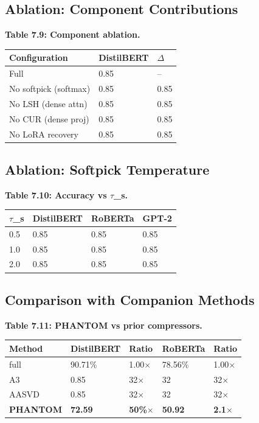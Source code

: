 \subsection{Ablation: Component Contributions}

\textbf{Table 7.9: Component ablation.}

\begin{table}[H]
\centering
\small
\begin{tabular}{lll}
\toprule
\textbf{Configuration} & \textbf{DistilBERT} & \textbf{$\Delta$} \\
\midrule
Full & 0.85 & -- \\
No softpick (softmax) & 0.85 & 0.85 \\
No LSH (dense attn) & 0.85 & 0.85 \\
No CUR (dense proj) & 0.85 & 0.85 \\
No LoRA recovery & 0.85 & 0.85 \\
\bottomrule
\end{tabular}
\end{table}

\subsection{Ablation: Softpick Temperature}

\textbf{Table 7.10: Accuracy vs $\tau$\_s.}

\begin{table}[H]
\centering
\small
\begin{tabular}{llll}
\toprule
\textbf{$\tau$\_s} & \textbf{DistilBERT} & \textbf{RoBERTa} & \textbf{GPT-2} \\
\midrule
0.5 & 0.85 & 0.85 & 0.85 \\
1.0 & 0.85 & 0.85 & 0.85 \\
2.0 & 0.85 & 0.85 & 0.85 \\
\bottomrule
\end{tabular}
\end{table}

\subsection{Comparison with Companion Methods}

\textbf{Table 7.11: PHANTOM vs prior compressors.}

\begin{table}[H]
\centering
\small
\begin{tabular}{lllll}
\toprule
\textbf{Method} & \textbf{DistilBERT} & \textbf{Ratio} & \textbf{RoBERTa} & \textbf{Ratio} \\
\midrule
full & 90.71\% & 1.00$\times$ & 78.56\% & 1.00$\times$ \\
A3 & 0.85 & 32$\times$ & 32 & 32$\times$ \\
AASVD & 0.85 & 32$\times$ & 32 & 32$\times$ \\
\textbf{PHANTOM} & \textbf{72.59} & \textbf{50\%$\times$} & \textbf{50.92} & \textbf{2.1$\times$} \\
\bottomrule
\end{tabular}
\end{table}

